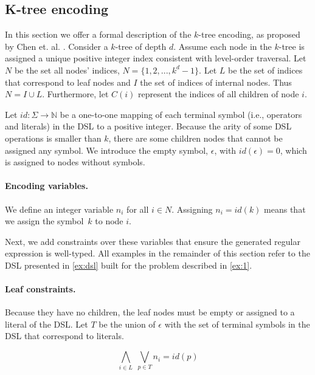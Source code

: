 \subsection{K-tree encoding}

\cite{DBLP:conf/sigsoft/ChenMF19,Orvalho19}

In this section we offer a formal description of the \(k\)-tree encoding, as proposed by Chen et. al. \cite{DBLP:conf/sigsoft/ChenMF19}.
Consider a \(k\)-tree of depth \(d\). Assume each node in the \(k\)-tree is assigned a unique positive integer index consistent with level-order traversal. Let \(N\) be the set all nodes' indices, \(N = \{1, 2, ..., k^d - 1\}\).
%
Let \(L\) be the set of indices that correspond to leaf nodes and \(I\) the set of indices of internal nodes. Thus \(N = I \cup L\). Furthermore, let \(C(i)\) represent the indices of all children of node \(i\).

Let \(id: \Sigma \to \mathbb{N}\) be a one-to-one mapping of each terminal symbol (i.e., operators and literals) in the DSL to a positive integer.
Because the arity of some DSL operations is smaller than \(k\), there are some children nodes that cannot be assigned any symbol. We introduce the empty symbol, \(\epsilon\), with \(id(\epsilon) = 0\), which is assigned to nodes without symbols.

\paragraph{Encoding variables.}
We define an integer variable \(n_i\) for all \(i \in N\). Assigning \(n_i = id(k)\) means
that we assign the symbol~\(k\) to node \(i\).

\medskip

Next, we add constraints over these variables that ensure the generated regular expression is well-typed. 
All examples in the remainder of this section refer to the DSL presented in \autoref{ex:dsl} built for the
problem described in \autoref{ex:1}.

\paragraph{Leaf constraints.} 
Because they have no children, the leaf nodes must be empty or assigned to a literal of the DSL.
Let \(T\) be the union of \(\epsilon\) with the set of terminal symbols in the DSL that correspond to literals.

\begin{equation}
    \bigwedge_{i \in L} \; \bigvee_{p \in T} n_i = id(p)
\end{equation}


